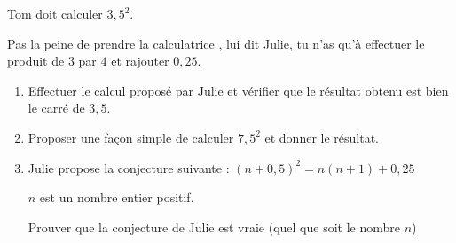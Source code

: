
\bigskip
 
Tom doit calculer $3,5^2$.
 
\og Pas la peine de prendre la calculatrice \fg, lui dit Julie, tu n'as qu'à effectuer le produit de $3$ par $4$ et rajouter $0,25$. 

\medskip

\begin{enumerate}
\item Effectuer le calcul proposé par Julie et vérifier que le résultat obtenu est bien le carré de $3,5$. 
\item Proposer une façon simple de calculer $7,5^2$ et donner le résultat. 
\item Julie propose la conjecture suivante : 	$(n + 0,5)^2 = n(n + 1) + 0,25$ 

$n$ est un nombre entier positif. 

Prouver que la conjecture de Julie est vraie (quel que soit le nombre $n$) 
\end{enumerate} 

\bigskip

